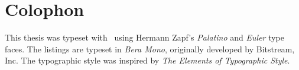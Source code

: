 \pagestyle{empty}

\hfill

\section*{Colophon}

This thesis was typeset with \LaTeXe\ using Hermann Zapf's \emph{Palatino} and
\emph{Euler} type faces. The listings are typeset in \emph{Bera Mono},
originally developed by Bitstream, Inc. The typographic style was inspired by
\emph{The Elements of Typographic Style}.

\bigskip
\noindent\finalVersionString
